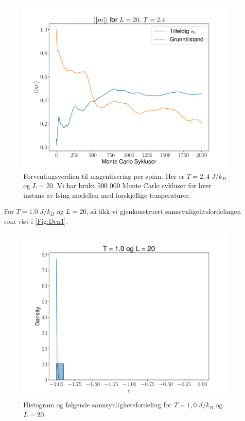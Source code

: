 \documentclass[reprint,english,notitlepage]{revtex4-2}  %
\begin{document}
\begin{figure}[H]
\centering
\includegraphics[scale=0.4, trim=2.5cm 0 0 0 ]{../Images/meanmT24L20.pdf}
\caption{Forventingsverdien til magentisering per spinn. Her er $T=2,4 \; J/k_B$ og $L = 20$. Vi har brukt 500 000 Monte Carlo sykluser for hver instans av Ising modellen med forskjellige temperaturer. }
\label{Fig:5m24}
\end{figure}

For $T = 1.0 \; J/k_B$ og $L = 20$, så fikk vi gjenkonstruert sannsynligehtsfordelingen som vist i \autoref{Fig:Den1}.

\begin{figure}[H]
\centering
\includegraphics[scale=0.4, trim=2.5cm 0 0 0]{../Images/T100L20.pdf}
\caption{Histogram og følgende sannsynlighetsfordeling for $T = 1,0 \; J/k_B$ og $L = 20$.}
\label{Den1}
\end{figure}
\end{document}
